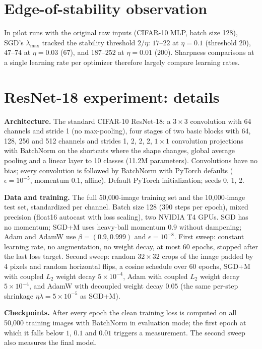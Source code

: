 \documentclass[10pt]{article}
\theoremstyle{remark}
\begin{document}
\section{Edge-of-stability observation}\label{app:eos}
In pilot runs with the original raw inputs (CIFAR-10 MLP, batch size 128), SGD's $\lambda_{\max}$ tracked the stability threshold $2/\eta$: $17$--$22$ at $\eta=0.1$ (threshold $20$), $47$--$74$ at $\eta=0.03$ ($67$), and $187$--$252$ at $\eta=0.01$ ($200$). Sharpness comparisons at a single learning rate per optimizer therefore largely compare learning rates.

\section{ResNet-18 experiment: details}\label{app:resnet}
\textbf{Architecture.} The standard CIFAR-10 ResNet-18: a $3\times3$ convolution with 64 channels and stride 1 (no max-pooling), four stages of two basic blocks with 64, 128, 256 and 512 channels and strides 1, 2, 2, 2, $1\times1$ convolution projections with BatchNorm on the shortcuts where the shape changes, global average pooling and a linear layer to 10 classes (11.2M parameters). Convolutions have no bias; every convolution is followed by BatchNorm with PyTorch defaults ($\epsilon=10^{-5}$, momentum $0.1$, affine). Default PyTorch initialization; seeds 0, 1, 2.

\textbf{Data and training.} The full 50{,}000-image training set and the 10{,}000-image test set, standardized per channel. Batch size 128 (390 steps per epoch), mixed precision (float16 autocast with loss scaling), two NVIDIA T4 GPUs. SGD has no momentum; SGD+M uses heavy-ball momentum $0.9$ without dampening; Adam and AdamW use $\beta=(0.9,0.999)$ and $\epsilon=10^{-8}$. First sweep: constant learning rate, no augmentation, no weight decay, at most 60 epochs, stopped after the last loss target. Second sweep: random $32\times32$ crops of the image padded by 4 pixels and random horizontal flips, a cosine schedule over 60 epochs, SGD+M with coupled $L_2$ weight decay $5\times10^{-4}$, Adam with coupled $L_2$ weight decay $5\times10^{-4}$, and AdamW with decoupled weight decay $0.05$ (the same per-step shrinkage $\eta\lambda=5\times10^{-5}$ as SGD+M).

\textbf{Checkpoints.} After every epoch the clean training loss is computed on all 50{,}000 training images with BatchNorm in evaluation mode; the first epoch at which it falls below $1$, $0.1$ and $0.01$ triggers a measurement. The second sweep also measures the final model.
\end{document}
